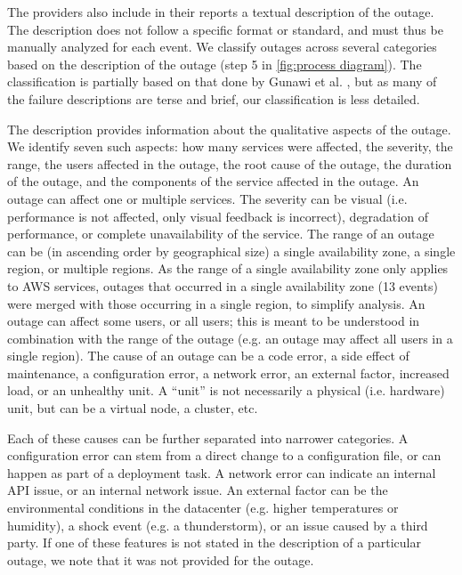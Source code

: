 The providers also include in their reports a textual description of the outage.
The description does not follow a specific format or standard, and must thus be manually analyzed for each event.
We classify outages across several categories based on the description of the outage (step 5 in \autoref{fig:process diagram}).
The classification is partially based on that done by Gunawi et al. \cite{gunawi2016, gunawi2014}, but as many of the failure descriptions are terse and brief, our classification is less detailed.

The description provides information about the qualitative aspects of the outage.
We identify seven such aspects: how many services were affected, the severity, the range, the users affected in the outage, the root cause of the outage, the duration of the outage, and the components of the service affected in the outage.
An outage can affect one or multiple services.
The severity can be visual (i.e. performance is not affected, only visual feedback is incorrect), degradation of performance, or complete unavailability of the service.
The range of an outage can be (in ascending order by geographical size) a single availability zone, a single region, or multiple regions.
As the range of a single availability zone only applies to AWS services, outages that occurred in a single availability zone (13 events) were merged with those occurring in a single region, to simplify analysis.
An outage can affect some users, or all users; this is meant to be understood in combination with the range of the outage (e.g. an outage may affect all users in a single region).
The cause of an outage can be a code error, a side effect of maintenance, a configuration error, a network error, an external factor, increased load, or an unhealthy unit.
A ``unit'' is not necessarily a physical (i.e. hardware) unit, but can be a virtual node, a cluster, etc.

Each of these causes can be further separated into narrower categories.
A configuration error can stem from a direct change to a configuration file, or can happen as part of a deployment task.
A network error can indicate an internal API issue, or an internal network issue.
An external factor can be the environmental conditions in the datacenter (e.g. higher temperatures or humidity), a shock event (e.g. a thunderstorm), or an issue caused by a third party.
If one of these features is not stated in the description of a particular outage, we note that it was not provided for the outage.
